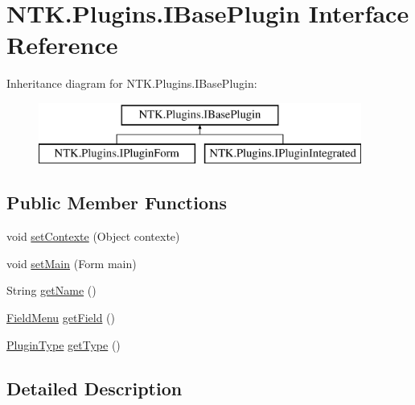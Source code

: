\hypertarget{interface_n_t_k_1_1_plugins_1_1_i_base_plugin}{}\section{N\+T\+K.\+Plugins.\+I\+Base\+Plugin Interface Reference}
\label{interface_n_t_k_1_1_plugins_1_1_i_base_plugin}


 


Inheritance diagram for N\+T\+K.\+Plugins.\+I\+Base\+Plugin\+:\begin{figure}[H]
\begin{center}
\leavevmode
\includegraphics[height=2.000000cm]{de/db8/interface_n_t_k_1_1_plugins_1_1_i_base_plugin}
\end{center}
\end{figure}
\subsection*{Public Member Functions}
\begin{DoxyCompactItemize}
\item 
void \mbox{\hyperlink{interface_n_t_k_1_1_plugins_1_1_i_base_plugin_aa24f2762da939495314b854c3b1dcff0}{set\+Contexte}} (Object contexte)
\item 
void \mbox{\hyperlink{interface_n_t_k_1_1_plugins_1_1_i_base_plugin_a3b1ceaa581149665ee9cf15d4b4fd932}{set\+Main}} (Form main)
\item 
String \mbox{\hyperlink{interface_n_t_k_1_1_plugins_1_1_i_base_plugin_ad4e4a8f2da57627a48ce585a2541d257}{get\+Name}} ()
\item 
\mbox{\hyperlink{namespace_n_t_k_1_1_plugins_af944b76d225e171a8ed7d3ca5e30667e}{Field\+Menu}} \mbox{\hyperlink{interface_n_t_k_1_1_plugins_1_1_i_base_plugin_aab71e6d0c09a8b9fb35a6fff7d58b3b0}{get\+Field}} ()
\item 
\mbox{\hyperlink{namespace_n_t_k_1_1_plugins_a28446e981e24d29d7c9c23b245f6987b}{Plugin\+Type}} \mbox{\hyperlink{interface_n_t_k_1_1_plugins_1_1_i_base_plugin_a0c78e824333f63504bc1fe81ef4e26f4}{get\+Type}} ()
\end{DoxyCompactItemize}


\subsection{Detailed Description}




